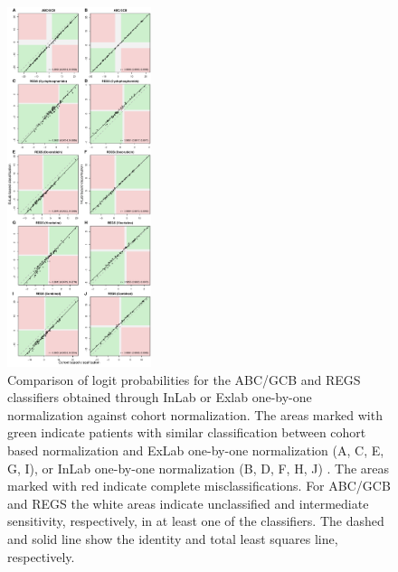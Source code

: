 \documentclass{article}
\begin{document}
\begin{figure}
\begin{center}
\includegraphics[width=0.375\textwidth]{figures/figure2.pdf}
\end{center}
\caption{
Comparison of logit probabilities for the ABC/GCB and REGS classifiers obtained through InLab or Exlab one-by-one normalization against cohort normalization.
The areas marked with green indicate patients with similar classification between cohort based normalization and ExLab one-by-one normalization (A, C, E, G, I), or InLab one-by-one normalization (B, D, F, H, J) .
The areas marked with red indicate complete misclassifications.
For ABC/GCB and REGS the white areas indicate unclassified and intermediate sensitivity, respectively, in at least one of the classifiers.
The dashed and solid line show the identity and total least squares line, respectively.
}
\label{fig:ABCGCBDrug}
\end{figure}
\end{document}
